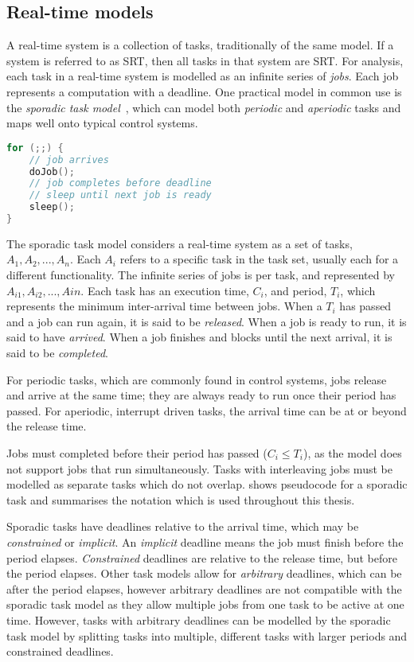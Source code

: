 \subsection{Real-time models}

A real-time system is a collection of tasks, traditionally of the same model. If a system is
referred to as \gls{SRT}, then all tasks in that system are \gls{SRT}. For analysis, each task in a
real-time system is modelled as an infinite series of \emph{jobs}. Each job represents a computation
with a deadline. 
One practical model in common use is the \emph{sporadic task model}~\citep{Sprunt_SL_89a}, which can
model both \emph{periodic} and \emph{aperiodic} tasks and maps well onto typical control systems. 

\begin{lstlisting}[frame=single,language=c,caption=Example of a basic sporadic real-time task.,label=list:sporadic,float=htpb]
for (;;) {
	// job arrives
	doJob();
	// job completes before deadline
    // sleep until next job is ready
    sleep();
}
\end{lstlisting}


The sporadic task model considers a real-time system as a set of tasks, $A_{1},A_{2},...,A_{n}$.
Each $A_{i}$ refers to a specific task in the task set, usually each for a different functionality.
The infinite series of jobs is per task, and represented by $A_{i1},A_{i2},...,A{in}$. Each task has
an execution time, $C_{i}$, and period, $T_{i}$, which represents the minimum inter-arrival time
between jobs. When a $T_{i}$ has passed and a job can run again, it is said to be \emph{released}.
When a job is ready to run, it is said to have \emph{arrived}. When a job finishes and blocks until
the next arrival, it is said to be \emph{completed}. 

For periodic tasks, which are commonly found in control systems, jobs release and arrive at the same
time; they are always ready to run once their period has passed. For aperiodic, \ie interrupt driven
tasks, the arrival time can be at or beyond the release time. 

Jobs must completed before their period has passed ($C_{i} \leq T_{i}$), as the model does not
support jobs that run simultaneously. Tasks with interleaving jobs must be modelled as separate
tasks which do not overlap.   shows pseudocode for a sporadic task and
 summarises the notation which is used throughout this thesis.

Sporadic tasks have deadlines relative to the arrival time, which may be \emph{constrained} or
\emph{implicit}.  An \emph{implicit} deadline means the job must finish before the period elapses.
\emph{Constrained} deadlines are relative to the release time, but before the period elapses.  Other
task models allow for \emph{arbitrary} deadlines, which can be after the period elapses, however
arbitrary deadlines are not compatible with the sporadic task model as they allow multiple jobs from
one task to be active at one time.  However, tasks with arbitrary deadlines can be modelled by the
sporadic task model by splitting tasks into multiple, different tasks with larger periods and
constrained deadlines.


